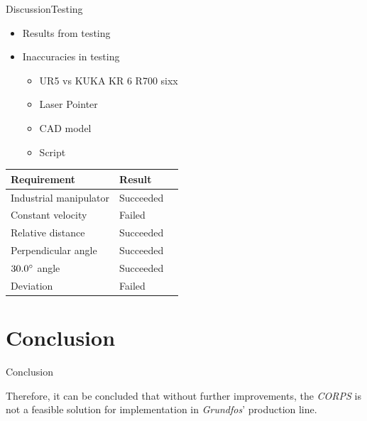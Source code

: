 \begin{frame}{Discussion}{Testing}
\begin{itemize}
    \item Results from testing
    \item Inaccuracies in testing
    \begin{itemize}
        \item UR5 vs KUKA KR 6 R700 sixx
        \item Laser Pointer
        \item CAD model
        \item Script
    \end{itemize}
\end{itemize}
\begin{table}[]
    \centering
    \begin{tabular}{l l l}
        \hline
        \rowcolor{beamer@barcolor}\textbf{Requirement} & \textbf{Result} \\
        \hline
        Industrial manipulator & Succeeded \\
        \rowcolor{beamer@barcolor}Constant velocity & Failed \\
        Relative distance & Succeeded\\
        \rowcolor{beamer@barcolor}Perpendicular angle & Succeeded\\
        $30.0\degree$ angle & Succeeded \\
        \rowcolor{beamer@barcolor}Deviation & Failed \\
        \hline
    \end{tabular}
\end{table}
\end{frame}

\section{Conclusion}
\begin{frame}{Conclusion}
\begin{center}
Therefore, it can be concluded that without further improvements, the \textit{CORPS} is not a feasible solution for implementation in \textit{Grundfos}’ production line.
\end{center}
\end{frame}

